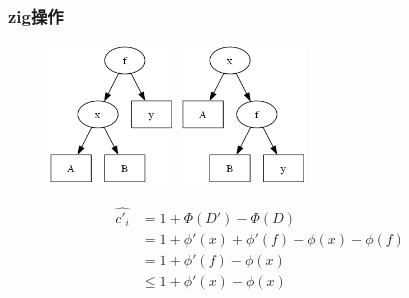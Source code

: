 \documentclass[utf8]{ctexbeamer}
\begin{document}
    \begin{frame}
        \frametitle{zig操作}
        \begin{figure}
            \includegraphics[width=0.3\textwidth]{images/right_rotate0.png}
            \includegraphics[width=0.3\textwidth]{images/right_rotate2.png}
        \end{figure}
        \begin{align}
            \hat{c'_i}&=1+\Phi(D')-\Phi(D)\nonumber\\
                      &=1+\phi'(x)+\phi'(f)-\phi(x)-\phi(f)\nonumber\\
                      &=1+\phi'(f)-\phi(x)\nonumber\\
                      &\le1+\phi'(x)-\phi(x)\nonumber
        \end{align}
    \end{frame}
\end{document}
